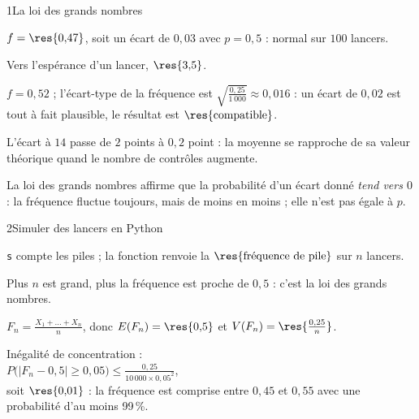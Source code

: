 

\begin{deuxcolonnes}

\begin{corrige}{1}{La loi des grands nombres}
\begin{questions}
  \item $f=\res{0{,}47}$, soit un écart de $0{,}03$ avec $p=0{,}5$ : normal sur $100$ lancers.
  \item Vers l'espérance d'un lancer, $\res{3{,}5}$.
  \item $f=0{,}52$ ; l'écart-type de la fréquence est $\sqrt{\frac{0{,}25}{1\,000}}\approx0{,}016$ : un écart de $0{,}02$ est tout à fait
    plausible, le résultat est $\res{\text{compatible}}$.
  \item L'écart à $14$ passe de $2$ points à $0{,}2$ point : la moyenne se rapproche de sa valeur théorique quand le nombre de contrôles
    augmente.
  \item La loi des grands nombres affirme que la probabilité d'un écart donné \emph{tend vers $0$} : la fréquence fluctue toujours,
    mais de moins en moins ; elle n'est pas égale à $p$.
\end{questions}
\end{corrige}

\begin{corrige}{2}{Simuler des lancers en Python}
\begin{questions}
  \item \texttt{s} compte les piles ; la fonction renvoie la $\res{\text{fréquence de pile}}$ sur $n$ lancers.
  \item Plus $n$ est grand, plus la fréquence est proche de $0{,}5$ : c'est la loi des grands nombres.
  \item $F_n=\frac{X_1+\dots+X_n}{n}$, donc $E(F_n)=\res{0{,}5}$ et $V(F_n)=\res{\frac{0{,}25}{n}}$.
  \item Inégalité de concentration :\\ $P\big(|F_n-0{,}5|\geq0{,}05\big)\leq\frac{0{,}25}{10\,000\times0{,}05^{2}}$,\\ soit $\res{0{,}01}$ :
    la fréquence est comprise entre $0{,}45$ et $0{,}55$ avec une probabilité d'au moins 99\,\%.
\end{questions}
\end{corrige}


\end{deuxcolonnes}
